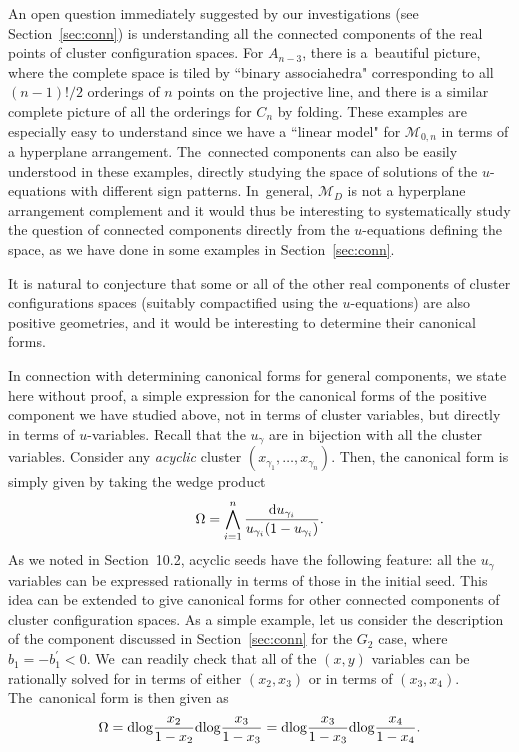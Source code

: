 \documentclass[10pt,a4paper]{amsart}
\def\M{{\mathcal{M}}}
\numberwithin{equation}{section}
\begin{document}
\bigskip{}
An open question immediately suggested by our investigations (see Section~\ref{sec:conn}) is understanding all the connected components of the real points of cluster configuration spaces. For $A_{n-3}$, there is a~beautiful picture, where the complete space is tiled by ``binary associahedra" corresponding to all $(n{-}1)!/2$ orderings of $n$ points on the projective line, and there is a similar complete picture of all the orderings for $C_n$ by folding. These examples are especially easy to understand since we have a ``linear model" for $\M_{0,n}$ in terms of a hyperplane arrangement. The~connected components can also be easily understood in these examples, directly studying the space of solutions of the $u$-equations with different sign patterns. In~general, $\M_D$ is not a hyperplane arrangement complement and it would thus be interesting to systematically study the question of connected components directly from the $u$-equations defining the space, as we have done in some examples in Section~\ref{sec:conn}.

It is natural to conjecture that some or all of the other real components of cluster configurations spaces (suitably compactified using the $u$-equations) are also positive geometries, and it would be interesting to determine their canonical forms.

In connection with determining canonical forms for general components, we state here without proof, a simple expression for the canonical forms of the positive component we have studied above, not in terms of cluster variables, but directly in terms of $u$-variables. Recall that the $u_\gamma$ are in bijection with all the cluster variables. Consider any {\it acyclic} cluster $(x_{\gamma_1}, \dots, x_{\gamma_n})$. Then, the canonical form is simply given by taking the wedge product
\begin{gather}\label{eq:canform}
\Omega = \bigwedge_{i=1}^n \frac{{\rm d} u_{\gamma_i}}{u_{\gamma_i} (1 - u_{\gamma_i})}.
\end{gather}
As we noted in Section~10.2, acyclic seeds have the following feature: all the $u_\gamma$ variables can be expressed rationally in terms of those in the initial seed. This idea can be extended to give canonical forms for other connected components of cluster configuration spaces. As a simple example, let us consider the description of the component discussed in Section~\ref{sec:conn} for the $G_2$ case, where $b_1 = - b^\prime_1 < 0$. We~can readily check that all of the $(x,y)$ variables can be rationally solved for in terms of either $(x_2,x_3)$ or in terms of $(x_3,x_4)$. The~canonical form is then given as
\begin{gather*}
\Omega = {\rm d log} \frac{x_2}{1-x_2} {\rm d log} \frac{x_3}{1-x_3} = {\rm d log} \frac{x_3}{1-x_3} {\rm d log} \frac{x_4}{1-x_4}.
\end{gather*}
\end{document}
